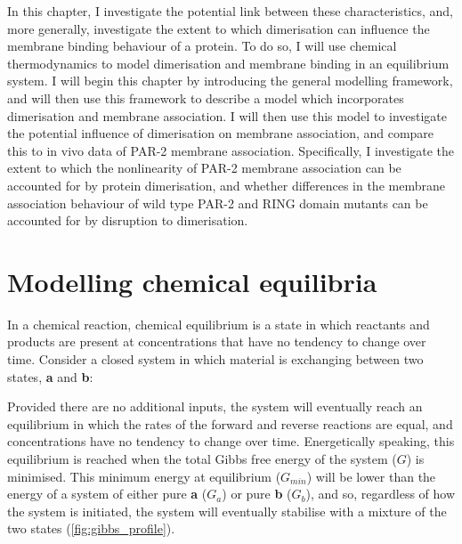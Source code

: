 \documentclass[12pt]{"report"}
\begin{document}
In this chapter, I investigate the potential link between these characteristics, and, more generally, investigate the extent to which dimerisation can influence the membrane binding behaviour of a protein. To do so, I will use chemical thermodynamics to model dimerisation and membrane binding in an equilibrium system. I will begin this chapter by introducing the general modelling framework, and will then use this framework to describe a model which incorporates dimerisation and membrane association. I will then use this model to investigate the potential influence of dimerisation on membrane association, and compare this to in vivo data of PAR-2 membrane association. Specifically, I investigate the extent to which the nonlinearity of PAR-2 membrane association can be accounted for by protein dimerisation, and whether differences in the membrane association behaviour of wild type PAR-2 and RING domain mutants can be accounted for by disruption to dimerisation.\\



\clearpage
\section{Modelling chemical equilibria}
\label{sec:modelling_chemical_equilibria}

In a chemical reaction, chemical equilibrium is a state in which reactants and products are present at concentrations that have no tendency to change over time. Consider a closed system in which material is exchanging between two states, \textbf{a} and \textbf{b}:
\begin{center}
\end{center}

Provided there are no additional inputs, the system will eventually reach an equilibrium in which the rates of the forward and reverse reactions are equal, and concentrations have no tendency to change over time. Energetically speaking, this equilibrium is reached when the total Gibbs free energy of the system ($G$) is minimised. This minimum energy at equilibrium ($G_{min}$) will be lower than the energy of a system of either pure \textbf{a} ($G_a$) or pure \textbf{b} ($G_b$), and so, regardless of how the system is initiated, the system will eventually stabilise with a mixture of the two states (\cref{fig:gibbs_profile}).\\ 
\end{document}
